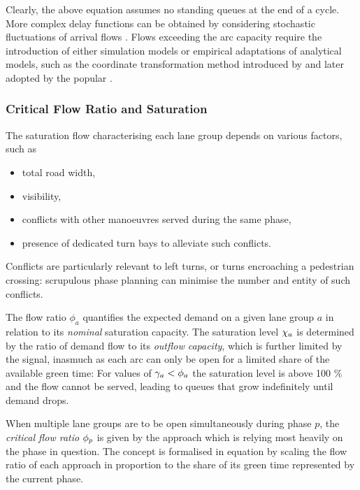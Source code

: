 Clearly, the above equation  assumes no standing queues at the end of a cycle. More complex delay functions can be obtained by considering stochastic fluctuations of arrival flows . 
Flows exceeding the arc capacity require the introduction of either simulation models or empirical adaptations of analytical models, such as the coordinate transformation method introduced by   and later adopted by the
popular  .

\subsubsection*{Critical Flow Ratio and Saturation}
The saturation flow characterising each lane group depends on various factors, such as
\begin{itemize}
\item total road width,
\item visibility,
\item conflicts with other manoeuvres served during the same phase,
\item presence of dedicated turn bays to alleviate such conflicts.
\end{itemize} 
Conflicts are particularly relevant to left turns, or turns encroaching a pedestrian crossing: scrupulous phase planning can minimise the number and entity of such conflicts.

The flow ratio $\phi_a$ quantifies the expected demand on a given lane group $a$ in relation to its \emph{nominal} saturation capacity.
The saturation level $\chi_a$ is determined by the ratio of demand flow to its \emph{outflow capacity}, which is further limited by the signal, inasmuch as each arc can only be open for a limited share of the available green time:
For values of $\gamma_{a} < \phi_a$ the saturation level is above 100 \% and the flow cannot be served, leading to queues that grow indefinitely until demand drops.

When multiple lane groups are to be open simultaneously during phase $p$, the \emph{critical flow ratio} $\phi_p$ is given by the approach which is relying most heavily on the phase in question.
The concept is formalised in equation  by scaling the flow ratio of each approach in proportion to the share of its green time represented by the current phase.

